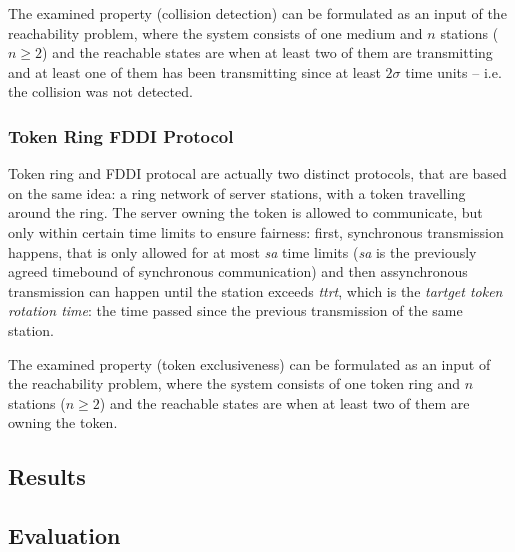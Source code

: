 The examined property (collision detection) can be formulated as an input of the reachability problem, where the system consists of one medium and $n$ stations ($n \geq 2$) and the reachable states are when at least two of them are transmitting and at least one of them has been transmitting since at least $2\sigma$ time units -- i.e. the collision was not detected.

\subsubsection{Token Ring FDDI Protocol}

Token ring and FDDI protocal are actually two distinct protocols, that are based on the same idea: a ring network of server stations, with a token travelling around the ring. The server owning the token is allowed to communicate, but only within certain time limits to ensure fairness: first, synchronous transmission happens, that is only allowed for at most \emph{sa} time limits (\emph{sa} is the previously agreed timebound of synchronous communication) and then assynchronous transmission can happen until the station exceeds \emph{ttrt}, which is the \emph{tartget token rotation time}: the time passed since the previous transmission of the same station.

The examined property (token exclusiveness) can be formulated as an input of the reachability problem, where the system consists of one token ring and $n$ stations ($n \geq 2$) and the reachable states are when at least two of them are owning the token.





\subsection{Results}



\subsection{Evaluation}



